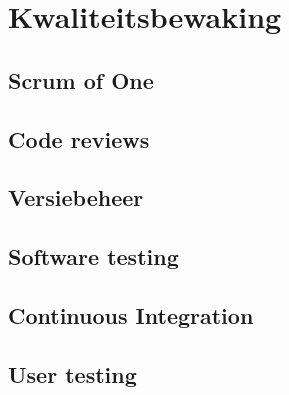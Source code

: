 \chapter{Kwaliteitsbewaking}

\section{Scrum of One}
\section{Code reviews}
\section{Versiebeheer}
\section{Software testing}
\section{Continuous Integration}
\section{User testing}